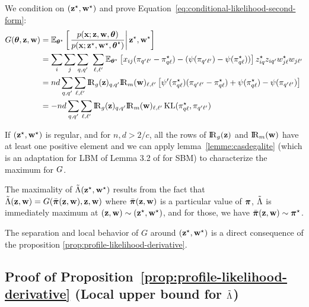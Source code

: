 \proofbegin
We condition on $(\mathbf{z}^\star, \mathbf{w}^\star)$ and prove Equation~\eqref{eq:conditional-likelihood-second-form}:
\begin{align*}
  \G(\btheta, \bz, \bw) & = \Esp_{\bthetas} \left[ \left. \frac{\prob(\bx; \bz,\bw,\btheta)}{\prob(\bx; \bzs,\bws,\bthetas)} \right| \bzs, \bws \right] \\
  & = \sum_{\ii} \sum_{\jj} \sum_{\kk,\kp}\ \sum_{\el,\lp} \Esp_{\bthetas}\left[ x_{ij} (\al_{\kp\lp} - \alskl) - (\norm(\al_{\kp\lp}) - \norm(\alskl)) \right] \z^\vrai_{\ii\kk} \z_{\ii\kp} \w^\vrai_{\jj\el} \w_{\jj\lp} \\
  & = \n\dd \sum_{\kk, \kp} \sum_{\el, \lp}  \Rgbz_{\kk,\kp} \Rmbw_{\el, \lp} \left[ \normp(\alskl) (\al_{\kp\lp} - \alskl) +  \norm(\alskl) - \norm(\al_{\kp\lp}) \right] \\
  & = - \n\dd \sum_{\kk,\kp} \sum_{\el,\lp} \Rgbz_{\kk,\kp} \Rmbw_{\el, \lp} \KL(\al^\vrai_{\kk\el}, \al_{\kp\lp})
\end{align*}

If $(\mathbf{z}^\star,\mathbf{w}^\star)$ is regular, and for $n, d > 2/c$, all the rows of $\Rgbz$ and $\Rmbw$ have
at least one positive element and we can apply
lemma~\ref{lemme:casdegalite} (which is an adaptation for LBM of Lemma 3.2 of \cite{bickel2013asymptotic} for SBM) to characterize the maximum for
$G$.

The maximality  of $\tilde{\Lambda}(\mathbf{z}^\star, \mathbf{w}^\star)$ results from the fact that $\tilde{\Lambda}(\mathbf{z}, \mathbf{w}) = G(\bar{\boldsymbol{\pi}}(\mathbf{z}, \mathbf{w}), \mathbf{z}, \mathbf{w})$ where
$\bar{\boldsymbol{\pi}}(\mathbf{z}, \mathbf{w})$ is a particular value of $\boldsymbol{\pi}$, $\tilde{\Lambda}$ is
immediately maximum at $(\mathbf{z}, \mathbf{w}) \sim (\mathbf{z}^\star,\mathbf{w}^\star)$, and for those, we have $\bar{\boldsymbol{\pi}}(\mathbf{z}, \mathbf{w}) \sim \boldsymbol{\pi}^\star$.

The separation and local behavior of $G$ around $(\mathbf{z}^\star, \mathbf{w}^\star)$ is a direct consequence of the proposition \ref{prop:profile-likelihood-derivative}.

\proofend

\subsection{Proof of Proposition~\ref{prop:profile-likelihood-derivative} (Local upper bound for  $\tilde{\Lambda}$)}

